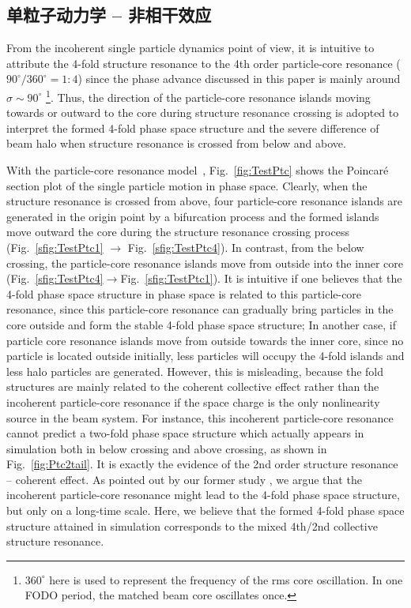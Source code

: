 \subsection{单粒子动力学 -- 非相干效应}
\label{section:Crossing_Incoherent}
From the incoherent single particle dynamics point of view, it is intuitive to
attribute the 4-fold structure resonance to the 4th order particle-core
resonance ($90^\circ/360^\circ=1:4$) since the phase advance discussed in this
paper is mainly around $\sigma\sim90^\circ$
\footnote{$360^\circ$ here is used to represent the frequency of the rms core
oscillation. In one FODO period, the matched beam core oscillates once.}.
Thus, the direction of the particle-core resonance islands moving towards or
outward to the core during structure resonance crossing is adopted to interpret
the formed 4-fold phase space structure \cite{25} and the severe difference of
beam halo when structure resonance is crossed from below and above.

With the particle-core resonance model~\cite{27,28}, Fig.~\ref{fig:TestPtc}
shows the Poincar\'{e} section plot of the single particle motion in phase
space. Clearly, when the structure resonance is crossed from above, four
particle-core resonance islands are generated in the origin point by a
bifurcation process \cite{29,30} and the formed islands move outward the core
during the structure resonance crossing process
(Fig.~\ref{sfig:TestPtc1} $\rightarrow$ Fig.~\ref{sfig:TestPtc4}).
In contrast, from the below crossing, the particle-core resonance islands move
from outside into the inner core
(Fig.~\ref{sfig:TestPtc4}$\rightarrow$Fig.~\ref{sfig:TestPtc1}).
It is intuitive if one believes that the 4-fold phase space structure in phase
space is related to this particle-core resonance, since this particle-core
resonance can gradually bring particles in the core outside and form the stable
4-fold phase space structure; In another case, if particle core resonance
islands move from outside towards the inner core, since no particle is located
outside initially, less particles will occupy the 4-fold islands and less halo
particles are generated. However, this is misleading, because the fold
structures are mainly related to the coherent collective effect rather than the
incoherent particle-core resonance if the space charge is the only nonlinearity
source in the beam system. For instance, this incoherent particle-core
resonance cannot predict a two-fold phase space structure which actually
appears in simulation both in below crossing and above crossing, as shown
in Fig.~\ref{fig:Ptc2tail}.
It is exactly the evidence of the 2nd order structure resonance -- coherent
effect. As pointed out by our former study \cite{17}, we argue that the
incoherent particle-core resonance might lead to the 4-fold phase space
structure, but only on a long-time scale. Here, we believe that the formed
4-fold phase space structure attained in simulation corresponds to the mixed
4th/2nd collective structure resonance.

